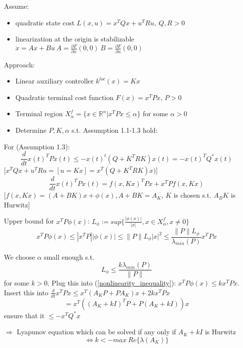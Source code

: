 Assume:
\begin{itemize}
\item quadratic state cost $L(x,u) = x^TQx + u^TRu, \ Q,R >0$
\item linearization at the origin is stabilizable 
$\dot x = Ax+Bu \ A = \frac{\partial F}{\partial x}(0,0) \ B = \frac{\partial F}{\partial u}(0,0)$
\end{itemize} 

Approach: 
\begin{itemize}
\item Linear auxiliary controller $k^{loc}(x)=Kx$
\item Quadratic terminal cost function $F(x) = x^TPx$, $P > 0$
\item Terminal region $X_{\alpha}^f = \{x \in \mathbb{R}^n | x^TPx \leq \alpha\}$ for some $\alpha > 0$
\item Determine $P,K,\alpha$ s.t. Assumption 1.1-1.3 hold:
\end{itemize}
For (Assumption 1.3):
\begin{equation*}
\frac{d}{dt}x(t)^TPx(t) \leq - x(t)^t(Q + K^TRK)x(t) = - x(t)^TQ^*x(t)
\end{equation*}
[$x^TQx + u^TRu = [u=Kx] = x^T(Q+K^TRK)x)$]
\begin{equation*}
\frac{d}{dt}x(t)^TPx(t) = f(x,Kx)^TPx + x^TPf(x,Kx)
\end{equation*}
[$f(x,Kx) = (A+BK)x+\phi(x), A+BK = A_K$, $K$ is chosen s.t. $A_BK$ is Hurwitz]

Upper bound for $x^TP\phi(x)$:
$L_{\phi} := sup\{ \frac{|\phi(x)|}{|x|}, x \in X_{\alpha}^{f}, x \neq 0\}$
\begin{equation}\label{nonlinearity_inequality}
x^TP\phi(x) \leq |x^TP| |\phi(x)| \leq \| P\| L_{\phi} |x|^2 \leq \frac{\|P\|L_{\phi}}{\lambda_{min}(P)}x^TPx
\end{equation}

We choose $\alpha$ small enough s.t. 
\begin{equation}\label{alpha_choice}
L_{\phi} \leq \frac{k \lambda_{min}(P)}{\|P\|} 
\end{equation}
for some $k > 0$. Plug this into (\ref{nonlinearity_inequality}): $x^TP\phi(x) \leq kx^TPx$. 
Insert this into $\frac{d}{dt}x^TPx \leq x^T(A_KP + PA_K)x + 2kx^TPx$
\begin{equation*}
= x^T((A_K + kI)^TP + P(A_K+kI))x
\end{equation*}
ensure that it $\leq - x^TQ^*x$

$\Rightarrow$ Lyapunov equation which can be solved if any only if $A_K + kI$ is Hurwitz 
\begin{equation}\label{k_choice_inequality}
\Leftrightarrow k < - max\ Re \{ \lambda(A_K)\}
\end{equation}

